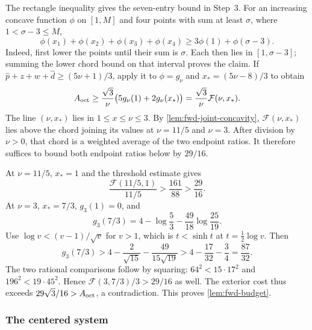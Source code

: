  The rectangle inequality gives the seven-entry bound in Step~3.
For an increasing concave function $\phi$ on $[1,M]$ and four points with sum at least
$\sigma$, where $1<\sigma-3\le M$,
\[
 \phi(x_1)+\phi(x_2)+\phi(x_3)+\phi(x_4)\ge3\phi(1)+\phi(\sigma-3).
\]
Indeed, first lower the points until their sum is $\sigma$. Each then lies in $[1,\sigma-3]$;
summing the lower chord bound on that interval proves the claim. If
$\hat p+z+w+\hat d\ge(5\nu+1)/3$, apply it to $\phi=g_\nu$ and
$x_*=(5\nu-8)/3$ to obtain
\[
 A_{\mathrm{oct}}\ge\frac{\sqrt3}{\nu}\bigl(5g_\nu(1)+2g_\nu(x_*)\bigr)
 =\frac{\sqrt3}{\nu}\mathcal F(\nu,x_*).
\]
The line $(\nu,x_*)$ lies in $1\le x\le\nu\le3$. By \cref{lem:fwd-joint-concavity},
$\mathcal F(\nu,x_*)$ lies above the chord joining its values at $\nu=11/5$ and $\nu=3$.
After division by $\nu>0$, that chord is a weighted average of the two endpoint ratios.
It therefore suffices to bound both endpoint ratios below by $29/16$.

At $\nu=11/5$, $x_*=1$ and the threshold estimate gives
\[
 \frac{\mathcal F(11/5,1)}{11/5}>
 \frac{161}{88}>\frac{29}{16}.
\]
At $\nu=3$, $x_*=7/3$, $g_3(1)=0$, and
\[
 g_3(7/3)=4-\log\frac53-\frac{49}{18}\log\frac{25}{19}.
\]
Use $\log v<(v-1)/\sqrt v$ for $v>1$, which is $t<\sinh t$ at $t=\frac12\log v$.
Then
\[
 g_3(7/3)>4-\frac2{\sqrt{15}}-\frac{49}{15\sqrt{19}}
 >4-\frac{17}{32}-\frac34=\frac{87}{32}.
\]
The two rational comparisons follow by squaring: $64^2<15\cdot17^2$ and
$196^2<19\cdot45^2$. Hence $\mathcal F(3,7/3)/3>29/16$ as well.
The exterior cost thus exceeds $29\sqrt3/16>A_{\mathrm{oct}}$, a contradiction. This proves
\cref{lem:fwd-budget}.

\subsubsection{The centered system}\label{app:fwd-centered}

